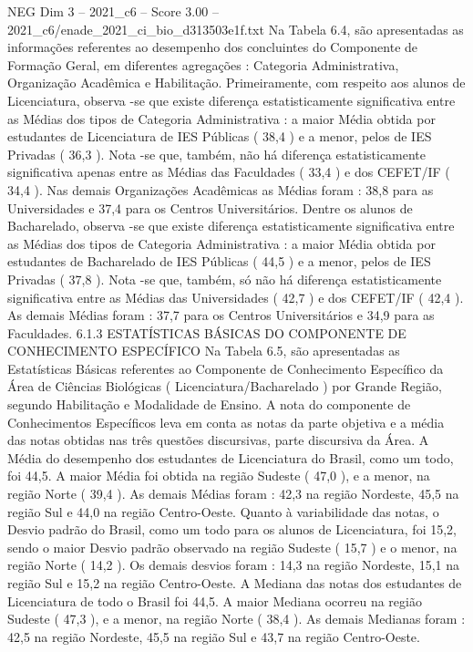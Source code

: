 \begin{textsample}{NEG Dim 3 – 2021\_c6 – Score 3.00 – 2021\_c6/enade\_2021\_ci\_bio\_d313503e1f.txt}
Na Tabela 6.4, são apresentadas as informações referentes ao desempenho dos concluintes do Componente de Formação Geral, em diferentes agregações : Categoria Administrativa, Organização Acadêmica e Habilitação.
Primeiramente, com respeito aos alunos de Licenciatura, observa -se que existe diferença estatisticamente significativa entre as Médias dos tipos de Categoria Administrativa : a maior Média obtida por estudantes de Licenciatura de IES Públicas ( 38,4 ) e a menor, pelos de IES Privadas ( 36,3 ).
Nota -se que, também, não há diferença estatisticamente significativa apenas entre as Médias das Faculdades ( 33,4 ) e dos CEFET/IF ( 34,4 ).
Nas demais Organizações Acadêmicas as Médias foram : 38,8 para as Universidades e 37,4 para os Centros Universitários.
Dentre os alunos de Bacharelado, observa -se que existe diferença estatisticamente significativa entre as Médias dos tipos de Categoria Administrativa : a maior Média obtida por estudantes de Bacharelado de IES Públicas ( 44,5 ) e a menor, pelos de IES Privadas ( 37,8 ).
Nota -se que, também, só não há diferença estatisticamente significativa entre as Médias das Universidades ( 42,7 ) e dos CEFET/IF ( 42,4 ).
As demais Médias foram : 37,7 para os Centros Universitários e 34,9 para as Faculdades. 6.1.3 ESTATÍSTICAS BÁSICAS DO COMPONENTE DE CONHECIMENTO ESPECÍFICO Na Tabela 6.5, são apresentadas as Estatísticas Básicas referentes ao Componente de Conhecimento Específico da Área de Ciências Biológicas ( Licenciatura/Bacharelado ) por Grande Região, segundo Habilitação e Modalidade de Ensino.
A nota do componente de Conhecimentos Específicos leva em conta as notas da parte objetiva e a média das notas obtidas nas três questões discursivas, parte discursiva da Área.
A Média do desempenho dos estudantes de Licenciatura do Brasil, como um todo, foi 44,5.
A maior Média foi obtida na região Sudeste ( 47,0 ), e a menor, na região Norte ( 39,4 ).
As demais Médias foram : 42,3 na região Nordeste, 45,5 na região Sul e 44,0 na região Centro-Oeste.
Quanto à variabilidade das notas, o Desvio padrão do Brasil, como um todo para os alunos de Licenciatura, foi 15,2, sendo o maior Desvio padrão observado na região Sudeste ( 15,7 ) e o menor, na região Norte ( 14,2 ).
Os demais desvios foram : 14,3 na região Nordeste, 15,1 na região Sul e 15,2 na região Centro-Oeste.
A Mediana das notas dos estudantes de Licenciatura de todo o Brasil foi 44,5.
A maior Mediana ocorreu na região Sudeste ( 47,3 ), e a menor, na região Norte ( 38,4 ).
As demais Medianas foram : 42,5 na região Nordeste, 45,5 na região Sul e 43,7 na região Centro-Oeste.

\end{textsample}

